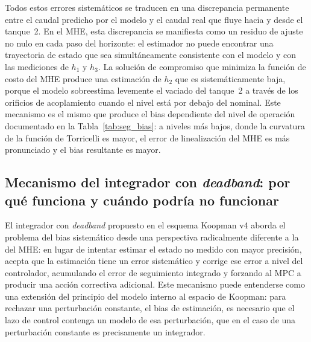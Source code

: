 \documentclass[12pt,letterpaper]{article}
\begin{document}
Todos estos errores sistemáticos se traducen en una discrepancia 
permanente entre el caudal predicho por el modelo y el caudal real 
que fluye hacia y desde el tanque~2. En el MHE, esta discrepancia 
se manifiesta como un residuo de ajuste no nulo en cada paso del 
horizonte: el estimador no puede encontrar una trayectoria de 
estado que sea simultáneamente consistente con el modelo y con las 
mediciones de $h_1$ y $h_3$. La solución de compromiso que 
minimiza la función de costo del MHE produce una estimación de 
$h_2$ que es sistemáticamente baja, porque el modelo sobreestima 
levemente el vaciado del tanque~2 a través de los orificios de 
acoplamiento cuando el nivel está por debajo del nominal. Este 
mecanismo es el mismo que produce el bias dependiente del nivel 
de operación documentado en la Tabla~\ref{tab:seg_bias}: a niveles 
más bajos, donde la curvatura de la función de Torricelli es mayor, 
el error de linealización del MHE es más pronunciado y el bias 
resultante es mayor.

\subsection{Mecanismo del integrador con \textit{deadband}: 
por qué funciona y cuándo podría no funcionar}
\label{sec:discusion_integrador}

El integrador con \textit{deadband} propuesto en el esquema 
Koopman v4 aborda el problema del bias sistemático desde una 
perspectiva radicalmente diferente a la del MHE: en lugar de 
intentar estimar el estado no medido con mayor precisión, acepta 
que la estimación tiene un error sistemático y corrige ese error 
a nivel del controlador, acumulando el error de seguimiento 
integrado y forzando al MPC a producir una acción correctiva 
adicional. Este mecanismo puede entenderse como una extensión 
del principio del modelo interno al espacio de Koopman: para 
rechazar una perturbación constante, el bias de estimación,
es necesario que el lazo de control contenga un modelo de esa
perturbación, que en el caso de una perturbación constante es 
precisamente un integrador.
\end{document}
